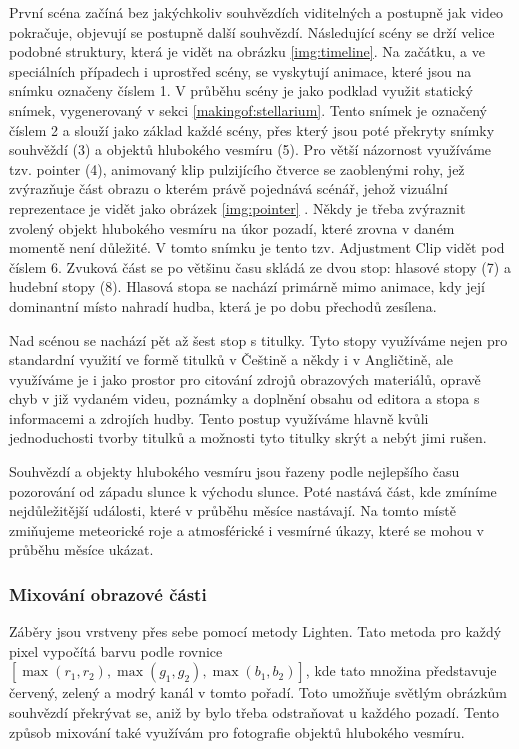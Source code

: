 \documentclass[12pt,a4paper,titlepage]{article}
\begin{document}
První scéna začíná bez jakýchkoliv souhvězdích viditelných a postupně jak video pokračuje, objevují se postupně další souhvězdí. Následující scény se drží velice podobné struktury, která je vidět na obrázku \ref{img:timeline}. Na začátku, a ve speciálních případech i uprostřed scény, se vyskytují animace, které jsou na snímku označeny číslem 1. V průběhu scény je jako podklad využit statický snímek, vygenerovaný v sekci \ref{makingof:stellarium}. Tento snímek je označený číslem 2 a slouží jako základ každé scény, přes který jsou poté překryty snímky souhvěždí (3) a objektů hlubokého vesmíru (5). Pro větší názornost využíváme tzv. pointer (4), animovaný klip pulzijícího čtverce se zaoblenými rohy, jež zvýrazňuje část obrazu o kterém právě pojednává scénář, jehož vizuální reprezentace je vidět jako obrázek \ref{img:pointer} . Někdy je třeba zvýraznit zvolený objekt hlubokého vesmíru na úkor pozadí, které zrovna v daném momentě není důležité. V tomto snímku je tento tzv. Adjustment Clip vidět pod číslem 6. Zvuková část se po většinu času skládá ze dvou stop: hlasové stopy (7) a hudební stopy (8). Hlasová stopa se nachází primárně mimo animace, kdy její dominantní místo nahradí hudba, která je po dobu přechodů zesílena.

Nad scénou se nachází pět až šest stop s titulky. Tyto stopy využíváme nejen pro standardní využití ve formě titulků v Češtině a někdy i v Angličtině, ale využíváme je i jako prostor pro citování zdrojů obrazových materiálů, opravě chyb v již vydaném videu, poznámky a doplnění obsahu od editora a stopa s informacemi a zdrojích hudby. Tento postup využíváme hlavně kvůli jednoduchosti tvorby titulků a možnosti tyto titulky skrýt a nebýt jimi rušen. 

Souhvězdí a objekty hlubokého vesmíru jsou řazeny podle nejlepšího času pozorování od západu slunce k východu slunce. Poté nastává část, kde zmíníme nejdůležitější události, které v průběhu měsíce nastávají. Na tomto místě zmiňujeme meteorické roje a atmosférické i vesmírné úkazy, které se mohou v průběhu měsíce ukázat.
\subsubsection{Mixování obrazové části}
Záběry jsou vrstveny přes sebe pomocí metody Lighten. Tato metoda pro každý pixel vypočítá barvu podle rovnice $[\max(r_1, r_2), \max(g_1, g_2), \max(b_1, b_2)]$, kde tato množina představuje červený, zelený a modrý kanál v tomto pořadí. Toto umožňuje světlým obrázkům souhvězdí překrývat se, aniž by bylo třeba odstraňovat u každého pozadí. Tento způsob mixování také využívám pro fotografie objektů hlubokého vesmíru. 
\end{document}
